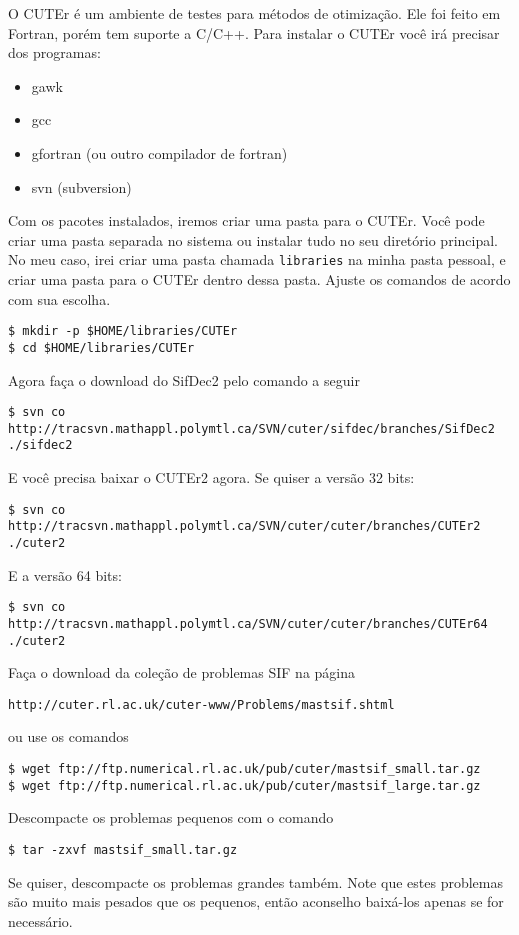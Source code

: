 \documentclass[letterpaper,11pt]{article}
\numberwithin{equation}{section}
\begin{document}
O CUTEr é um ambiente de testes para métodos de otimização. 
Ele foi feito em Fortran, porém tem suporte a C/C++.
Para instalar o CUTEr você irá precisar dos programas:
\begin{itemize}
 \item gawk 
 \item gcc 
 \item gfortran (ou outro compilador de fortran)
 \item svn (subversion)
\end{itemize}
Com os pacotes instalados, iremos criar uma pasta para o CUTEr. Você pode criar uma
pasta separada no sistema ou instalar tudo no seu diretório principal. No meu caso,
irei criar uma pasta chamada \verb+libraries+ na minha pasta pessoal, e criar uma
pasta para o CUTEr dentro dessa pasta. Ajuste os comandos de acordo com sua escolha.
\begin{verbatim}
$ mkdir -p $HOME/libraries/CUTEr
$ cd $HOME/libraries/CUTEr
\end{verbatim}
Agora faça o download do SifDec2 pelo comando a seguir
\small
\begin{verbatim}
$ svn co http://tracsvn.mathappl.polymtl.ca/SVN/cuter/sifdec/branches/SifDec2 ./sifdec2
\end{verbatim}
E você precisa baixar o CUTEr2 agora. Se quiser a versão 32 bits:
\begin{verbatim}
$ svn co http://tracsvn.mathappl.polymtl.ca/SVN/cuter/cuter/branches/CUTEr2 ./cuter2
\end{verbatim}
E a versão 64 bits:
\begin{verbatim}
$ svn co http://tracsvn.mathappl.polymtl.ca/SVN/cuter/cuter/branches/CUTEr64 ./cuter2
\end{verbatim}
\normalsize
Faça o download da coleção de problemas SIF na página
\begin{verbatim}
http://cuter.rl.ac.uk/cuter-www/Problems/mastsif.shtml
\end{verbatim}
ou use os comandos
\begin{verbatim}
$ wget ftp://ftp.numerical.rl.ac.uk/pub/cuter/mastsif_small.tar.gz 
$ wget ftp://ftp.numerical.rl.ac.uk/pub/cuter/mastsif_large.tar.gz
\end{verbatim}
Descompacte os problemas pequenos com o comando
\begin{verbatim}
$ tar -zxvf mastsif_small.tar.gz 
\end{verbatim}
Se quiser, descompacte os problemas grandes também. Note que estes problemas são
muito mais pesados que os pequenos, então aconselho baixá-los apenas se for necessário.
\end{document}
